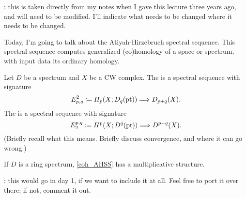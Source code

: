 \TODO: this is taken directly from my notes when I gave this lecture three years ago, and will need to be modified.
I'll indicate what needs to be changed where it needs to be changed.

Today, I'm going to talk about the Atiyah-Hirzebruch spectral sequence. This spectral sequence computes generalized
(co)homology of a space or spectrum, with input data its ordinary homology.

Let $D$ be a spectrum and $X$ be a CW complex. The  is a
spectral sequence with signature
\begin{equation}
	E^2_{p,q} \coloneqq H_p(X; D_q(\mathrm{pt})) \Longrightarrow D_{p+q}(X).
\end{equation}
The  is a spectral sequence with signature
\begin{equation}
\label{coh_AHSS}
	E_2^{p,q} \coloneqq H^p(X; D^q(\mathrm{pt})) \Longrightarrow D^{p+q}(X).
\end{equation}
(Briefly recall what this means. Briefly discuss convergence, and where it can go wrong.)

If $D$ is a ring spectrum, \eqref{coh_AHSS} has a multiplicative structure.

\TODO: this would go in day 1, if we want to include it at all. Feel free to port it over there; if not, comment it
out.
